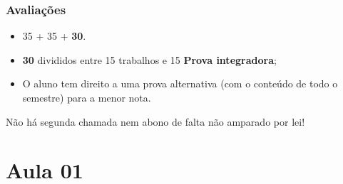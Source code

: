 \begin{frame}
    \frametitle{Avaliações}
    \begin{itemize}
        \item 35 + 35 + {\bf 30}.
        \item {\bf 30} divididos entre 15 trabalhos e 15 {\bf Prova integradora};
        \item O aluno tem direito a uma prova alternativa (com o conteúdo de
              todo o semestre) para a menor nota.
    \end{itemize}
    \begin{block}{}
    Não há segunda chamada{\bf *} nem abono{\bf *}
    de falta não amparado por lei!
    \end{block}
\end{frame}

\section{Aula 01}
